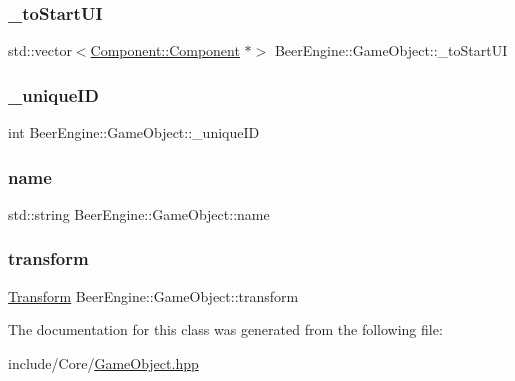 \subsubsection{\texorpdfstring{\+\_\+to\+Start\+UI}{\_toStartUI}}
{\footnotesize\ttfamily std\+::vector$<$\mbox{\hyperlink{class_beer_engine_1_1_component_1_1_component}{Component\+::\+Component}} $\ast$$>$ Beer\+Engine\+::\+Game\+Object\+::\+\_\+to\+Start\+UI\hspace{0.3cm}{\ttfamily [protected]}}

\mbox{\label{class_beer_engine_1_1_game_object_a7520a234dc0f49d03deac22a6d4b8e19}} 
\subsubsection{\texorpdfstring{\+\_\+unique\+ID}{\_uniqueID}}
{\footnotesize\ttfamily int Beer\+Engine\+::\+Game\+Object\+::\+\_\+unique\+ID}

\mbox{\label{class_beer_engine_1_1_game_object_a14a6872777d4a7be2c967a0169a7880a}} 
\subsubsection{\texorpdfstring{name}{name}}
{\footnotesize\ttfamily std\+::string Beer\+Engine\+::\+Game\+Object\+::name}

\mbox{\label{class_beer_engine_1_1_game_object_ac17bf13885d36b7ae8b1164e1ec13a02}} 
\subsubsection{\texorpdfstring{transform}{transform}}
{\footnotesize\ttfamily \mbox{\hyperlink{class_beer_engine_1_1_transform}{Transform}} Beer\+Engine\+::\+Game\+Object\+::transform}



The documentation for this class was generated from the following file\+:\begin{DoxyCompactItemize}
\item 
include/\+Core/\mbox{\hyperlink{_game_object_8hpp}{Game\+Object.\+hpp}}\end{DoxyCompactItemize}
